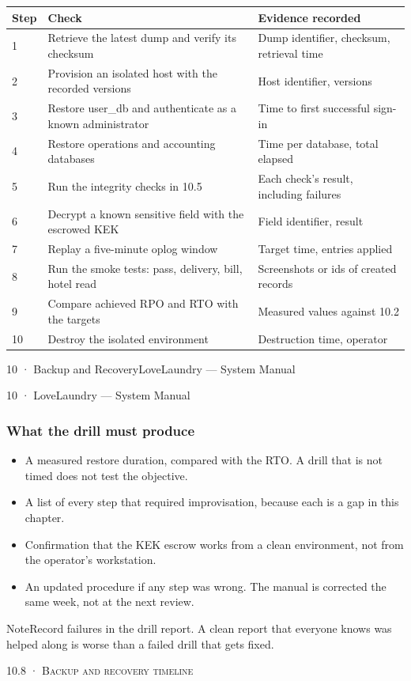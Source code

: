 \documentclass[11pt,a4paper,oneside]{book}
\begin{document}
\begin{center}\small
\begin{tabularx}{\linewidth}{|X|X|X|}
\hline
\rowcolor{lightgrey}
\textbf{Step} & \textbf{Check} & \textbf{Evidence recorded} \\ \hline
1 & Retrieve the latest dump and verify its checksum & Dump identifier, checksum, retrieval time \\ \hline
2 & Provision an isolated host with the recorded versions & Host identifier, versions \\ \hline
3 & Restore user\_db and authenticate as a known administrator & Time to first successful sign-in \\ \hline
4 & Restore operations and accounting databases & Time per database, total elapsed \\ \hline
5 & Run the integrity checks in 10.5 & Each check's result, including failures \\ \hline
6 & Decrypt a known sensitive field with the escrowed KEK & Field identifier, result \\ \hline
7 & Replay a five-minute oplog window & Target time, entries applied \\ \hline
8 & Run the smoke tests: pass, delivery, bill, hotel read & Screenshots or ids of created records \\ \hline
9 & Compare achieved RPO and RTO with the targets & Measured values against 10.2 \\ \hline
10 & Destroy the isolated environment & Destruction time, operator \\ \hline
\end{tabularx}
\end{center}
10 · Backup and RecoveryLoveLaundry — System Manual

10 · LoveLaundry — System Manual

\subsubsection*{What the drill must produce}
\begin{itemize}
\item A measured restore duration, compared with the RTO. A drill that is not timed does not test the objective.
\item A list of every step that required improvisation, because each is a gap in this chapter.
\item Confirmation that the KEK escrow works from a clean environment, not from the operator's workstation.
\item An updated procedure if any step was wrong. The manual is corrected the same week, not at the next review.
\end{itemize}
\begin{notebox}NoteRecord failures in the drill report. A clean report that everyone knows was helped along is worse than a failed drill that gets fixed.\end{notebox}
\textsc{\small\color{crimson}10.8 · Backup and recovery timeline}\par\medskip
\end{document}
